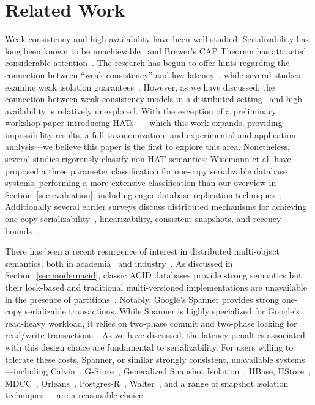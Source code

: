 
\section{Related Work}

Weak consistency and high availability have been well
studied. Serializability has long been known to be
unachievable~\cite{davidson-survey} and Brewer's CAP Theorem has
attracted considerable attention~\cite{gilbert-cap}. The research has
begun to offer hints regarding the connection between ``weak
consistency'' and low latency~\cite{abadi-pacelc}, while several
studies examine weak isolation guarantees~\cite{adya,
  ansicritique}. However, as we have discussed, the connection between
weak consistency models in a distributed setting~\cite{calm, crdt} and
high availability is relatively unexplored. With the exception of a
preliminary workshop paper introducing HATs~\cite{hat-hotos}--- which
this work expands, providing impossibility results, a full
taxonomization, and experimental and application analysis---we believe
this paper is the first to explore this area. Nonetheless, several
studies rigorously classify non-HAT semantics: Wisemann et al. have
proposed a three parameter classification for one-copy serializable
database systems, performing a more extensive classification than our
overview in Section~\ref{sec:evaluation}, including eager database
replication techniques~\cite{kemme-classification}. Additionally
several earlier surveys discuss distributed mechanisms for achieving
one-copy serializability~\cite{wisemann-survey}, linearizability,
consistent snapshots, and recency bounds~\cite{ceri-mechanism,
  chen-mechanism}.

There has been a recent resurgence of interest in distributed
multi-object semantics, both in academia~\cite{kraska-s3, gstore,
  mdcc, eiger, walter,calvin, swift} and industry~\cite{orleans,
  spanner}. As discussed in Section~\ref{sec:modernacid}, classic ACID
databases provide strong semantics but their lock-based and
traditional multi-versioned implementations are unavailable in the
presence of partitions~\cite{bernstein-book, gray-isolation}. Notably,
Google's Spanner provides strong one-copy serializable
transactions. While Spanner is highly specialized for Google's
read-heavy workload, it relies on two-phase commit and two-phase
locking for read/write transactions~\cite{spanner}. As we have
discussed, the latency penalties associated with this design choice
are fundamental to serializability. For users willing to tolerate
these costs, Spanner, or similar strongly consistent, unavailable
systems---including Calvin~\cite{calvin}, G-Store~\cite{gstore},
Generalized Snapshot Isolation~\cite{generalizedsnapshot}, HBase,
HStore~\cite{hstore}, MDCC~\cite{mdcc}, Orleans~\cite{orleans},
Postgres-R~\cite{kemme-thesis}, Walter~\cite{walter}, and a range of
snapshot isolation techniques~\cite{middleware-db, kemme-snapshot,
  daudjee-snapshot}---are a reasonable choice.

